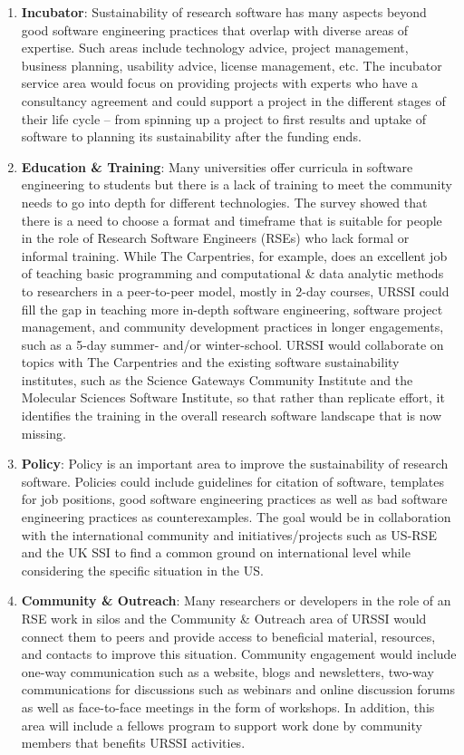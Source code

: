 \documentclass[
]{book}
\begin{document}
\begin{enumerate}
\def\labelenumi{\arabic{enumi}.}
\item
  \textbf{Incubator}: Sustainability of research software has many aspects beyond good
  software engineering practices that overlap with diverse areas of expertise. Such areas
  include technology advice, project management, business planning, usability advice, license
  management, etc. The incubator service area would focus on providing projects with experts
  who have a consultancy agreement and could support a project in the different stages of
  their life cycle -- from spinning up a project to first results and uptake of software to
  planning its sustainability after the funding ends.
\item
  \textbf{Education \& Training}: Many universities offer curricula in software engineering to
  students but there is a lack of training to meet the community needs to go into depth for
  different technologies. The survey showed that there is a need to choose a format and
  timeframe that is suitable for people in the role of Research Software Engineers (RSEs)
  who lack formal or informal training. While The Carpentries, for example, does an
  excellent job of teaching basic programming and computational \& data analytic methods to
  researchers in a peer-to-peer model, mostly in 2-day courses, URSSI could fill the gap in
  teaching more in-depth software engineering, software project management, and community
  development practices in longer engagements, such as a 5-day summer- and/or winter-school.
  URSSI would collaborate on topics with The Carpentries and the existing software
  sustainability institutes, such as the Science Gateways Community Institute and the
  Molecular Sciences Software Institute, so that rather than replicate effort, it identifies
  the training in the overall research software landscape that is now missing.
\item
  \textbf{Policy}: Policy is an important area to improve the sustainability of research
  software. Policies could include guidelines for citation of software, templates for
  job positions, good software engineering practices as well as bad software engineering
  practices as counterexamples. The goal would be in collaboration with the international
  community and initiatives/projects such as US-RSE and the UK SSI to find a common ground
  on international level while considering the specific situation in the US.
\item
  \textbf{Community \& Outreach}: Many researchers or developers in the role of an RSE work
  in silos and the Community \& Outreach area of URSSI would connect them to peers and
  provide access to beneficial material, resources, and contacts to improve this situation.
  Community engagement would include one-way communication such as a website, blogs and
  newsletters, two-way communications for discussions such as webinars and online discussion
  forums as well as face-to-face meetings in the form of workshops. In addition, this area
  will include a fellows program to support work done by community members that benefits
  URSSI activities.
\end{enumerate}
\end{document}
